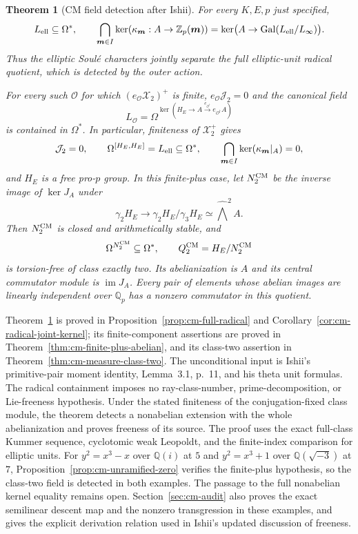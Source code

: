\documentclass[11pt]{article}
\newtheorem{theorem}{Theorem}[section]
\theoremstyle{definition}\newtheorem{definition}[theorem]{Definition}
\begin{document}
\begin{theorem}[CM field detection after Ishii]\label{thm:cm-main}
For every $K,E,p$ just specified,
\[
 L_{\rm ell}\subseteq\Omega^*,\qquad
 \bigcap_{\boldsymbol m\in I}\ker(\kappa_{\boldsymbol m}:A
       \to\mathbb Z_p(\boldsymbol m))
 =\ker\bigl(A\to\operatorname{Gal}(L_{\rm ell}/L_\infty)\bigr).
\]
Thus the elliptic Soul\'e characters jointly separate the full
elliptic-unit radical quotient, which is detected by the outer action.

For every such $\mathcal O$ for which $(e_{\mathcal O}\mathcal X_2)^+$
is finite, $e_{\mathcal O}\mathcal J_2=0$ and the canonical field
\[
 L_{\mathcal O}=
  \Omega^{\ker(H_E\longrightarrow A
                 \xrightarrow{e_{\mathcal O^\dagger}}e_{\mathcal O^\dagger}A)}
\]
is contained in $\Omega^*$.
In particular, finiteness of $\mathcal X_2^+$ gives
\[
 \mathcal J_2=0,\qquad
 \Omega^{[H_E,H_E]}=L_{\rm ell}\subseteq\Omega^*,\qquad
 \bigcap_{\boldsymbol m\in I}\ker(\kappa_{\boldsymbol m}|_A)=0,
\]
and $H_E$ is a free pro-$p$ group. In this finite-plus case, let
\(N_2^{\rm CM}\) be the inverse image of \(\ker J_A\) under
\[
 \gamma_2H_E\longrightarrow\gamma_2H_E/\gamma_3H_E
                  \simeq\widehat{\bigwedge}^2 A.
\]
Then \(N_2^{\rm CM}\) is closed and arithmetically stable, and
\[
 \Omega^{N_2^{\rm CM}}\subseteq\Omega^*,\qquad
 Q_2^{\rm CM}=H_E/N_2^{\rm CM}
\]
is torsion-free of class exactly two. Its abelianization is \(A\)
and its central commutator module is \(\operatorname{im}J_A\). Every pair of elements whose abelian images are linearly independent over \(\mathbb Q_p\) has a nonzero commutator in this quotient.
\end{theorem}

Theorem~\ref{thm:cm-main} is proved in
Proposition~\ref{prop:cm-full-radical} and
Corollary~\ref{cor:cm-radical-joint-kernel}; its finite-component assertions are proved in Theorem~\ref{thm:cm-finite-plus-abelian}, and its class-two assertion in Theorem~\ref{thm:cm-measure-class-two}. The unconditional input is Ishii's
primitive-pair moment identity, Lemma~3.1, p.~11, and his theta
unit formulas. The radical containment imposes no ray-class-number, prime-decomposition,
or Lie-freeness hypothesis. Under the stated finiteness of the conjugation-fixed
class module, the theorem detects a nonabelian extension with the whole
abelianization and proves freeness of its source. The proof uses the exact full-class Kummer sequence,
cyclotomic weak Leopoldt, and the finite-index comparison for elliptic units. For $y^2=x^3-x$ over $\mathbb Q(i)$
at $5$ and $y^2=x^3+1$ over $\mathbb Q(\sqrt{-3})$ at $7$,
Proposition~\ref{prop:cm-unramified-zero} verifies the finite-plus
hypothesis, so the class-two field is detected in both examples. The passage to the
full nonabelian kernel equality remains open. Section~\ref{sec:cm-audit}
also proves the exact semilinear descent map and the nonzero
transgression in these examples, and gives the explicit derivation
relation used in Ishii's updated discussion of freeness.
\end{document}
